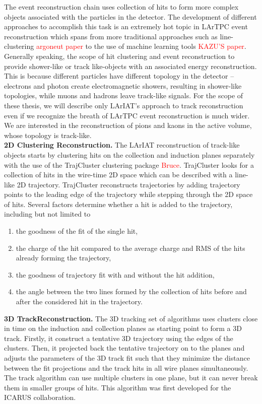 The event reconstruction chain uses collection of hits to form more complex objects associated with the particles in the detector. The development of different approaches to accomplish this task is an extremely hot topic in LArTPC event reconstruction which spans from more traditional approaches such as line-clustering  \cite{MicroBooNE} \textcolor{red}{argoneut paper} to the use of machine learning tools \cite{MicroBooNE} \textcolor{red}{KAZU'S paper}. Generally speaking, the scope of hit clustering and event reconstruction to provide shower-like or track like-objects with an associated energy reconstruction. This is because different particles have different topology in the detector -- electrons and photon create electromagnetic showers,  resulting in shower-like topologies, while muons and hadrons  leave track-like signals.  For the scope of these thesis, we will describe only LArIAT's approach to track reconstruction even if we recognize the breath of LArTPC event reconstruction is much wider. We are interested in the reconstruction of pions and kaons in the active volume, whose topology is track-like.\\

\textbf{2D Clustering Reconstruction.} 
The LArIAT reconstruction of track-like objects starts by clustering hits on the collection and induction planes separately with the use of the TrajCluster clustering package\cite{Bruce} \textcolor{red}{Bruce}. 
TrajCluster looks for a collection of hits in the wire-time 2D space which can be described with a line-like 2D trajectory. TrajCluster reconstructs trajectories by adding trajectory points to the leading edge of the trajectory while stepping through the 2D space of hits. Several factors determine whether a hit is added to the trajectory, including but not limited to
\begin{enumerate}
\item the goodness of the fit of the single hit,
\item the charge of the hit compared to the average charge and RMS of the hits already forming the trajectory,
\item the goodness of trajectory fit with and without the hit addition,
\item the angle between the two lines formed by the collection of hits before and after the considered hit in the trajectory.
\end{enumerate}

\textbf{3D TrackReconstruction.} The 3D tracking set of algorithms uses clusters close in time on the induction and collection planes as starting point to form a 3D track. Firstly, it construct a tentative 3D trajectory using the edges of the clusters. Then, it  projected back the tentative trajectory on to the planes and adjusts the parameters of the 3D track fit such that they minimize the distance between the fit projections and the track hits in all wire planes simultaneously.  The track algorithm can use multiple clusters in one plane, but it can never break them in smaller groups of hits. This algorithm was first developed for the ICARUS collaboration\cite{Antonello2013}.


